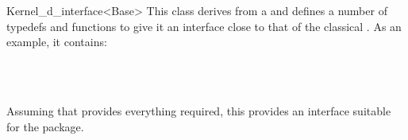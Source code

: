 \begin{ccRefClass}{Kernel_d_interface<Base>}
\ccDefinition
This class derives from a   and defines a number
of typedefs and functions to give it an interface close to that of the
classical . As an example, it contains:

\\
\\

Assuming that  provides everything required, this provides
an interface suitable for the  package.

\ccIsModel
{}

\end{ccRefClass}
